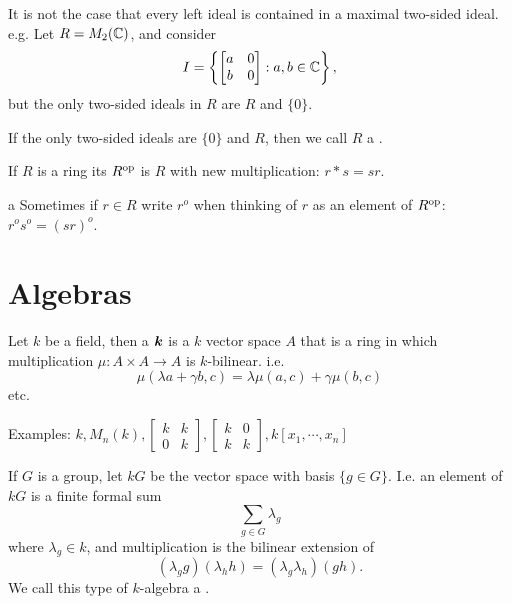    It is not the case that every left ideal is contained in a
  maximal two-sided ideal. e.g. Let $R = M_2(\mathbb{C})$, and consider
  \[ I = \left\{ \begin{bmatrix} a & 0 \\ b & 0 \end{bmatrix} : a,b\in \mathbb{C} \right\}, \]
  but the only two-sided ideals in $R$ are $R$ and $\{0\}$.

  \begin{define}
    If the only two-sided ideals are $\{0\}$ and $R$, then we call $R$ a
    .
  \end{define}

  \begin{define}
    If $R$ is a ring its  $R^{\text{op}}$ is $R$ with new
    multiplication: $r*s = sr$.
  \end{define}a
  Sometimes if $r\in R$ write $r^o$ when thinking of $r$ as an element of
  $R^{\text{op}}$: $r^os^o=(sr)^o$.

\section{Algebras}

  \begin{define}
    Let $k$ be a field, then a $\boldsymbol{k}$ is a $k$ vector space $A$
    that is a ring in which multiplication $\mu: A \times A \to A$ is
    $k$-bilinear. i.e.
    \[\mu(\lambda a + \gamma b, c) = \lambda\mu(a,c) + \gamma\mu(b,c) \]
    etc.
  \end{define}

  Examples: $k, M_n(k), \begin{bmatrix} k & k \\ 0 & k \end{bmatrix},
    \begin{bmatrix} k & 0 \\ k & k \end{bmatrix}, k[x_1,\cdots,x_n]$

  \begin{define}
    If $G$ is a group, let $kG$ be the vector space with basis $\{g \in G\}$.
    I.e. an element of $kG$ is a finite formal sum
    \[ \sum_{g \in G} \lambda_g \]
    where $\lambda_g \in k$, and multiplication is the bilinear extension of
    \[ (\lambda_g g) (\lambda_h h) = (\lambda_g \lambda_h) (g h). \]
    We call this type of $k$-algebra a .
  \end{define}

